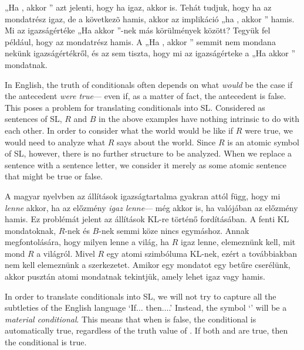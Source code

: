 „Ha , akkor ” azt jelenti, hogy ha  igaz, akkor  is. Tehát tudjuk, hogy ha
az  mondatrész igaz, de a következõ  hamis, akkor az implikáció „ha
 , akkor  ” hamis. Mi az igazságértéke „Ha  akkor ”-nek más körülmények között?
Tegyük fel például, hogy az  mondatrész hamis. A „Ha , akkor ” semmit nem mondana
 nekünk   igazságértékről, és az sem tiszta, hogy mi az igazságérteke a „Ha  akkor ” mondatnak.




In English, the truth of conditionals often depends on what \emph{would} be the case if the antecedent \emph{were true}--- even if, as a matter of fact, the antecedent is false. This poses a problem for translating conditionals into SL.  Considered as sentences of SL, $R$ and $B$ in the above examples have nothing intrinsic to do with each other. In order to consider what the world would be like if $R$ were true, we would need to analyze what $R$ says about the world. Since $R$ is an atomic symbol of SL, however, there is no further structure to be analyzed. When we replace a sentence with a sentence letter, we consider it merely as some atomic sentence that might be true or false.

A magyar nyelvben az állítások igazságtartalma gyakran attól függ, hogy mi \emph{lenne} akkor, ha az előzmény \emph{igaz lenne}--- még akkor is, ha valójában az előzmény hamis. Ez problémát jelent az állítások KL-re történő fordításában. A fenti KL mondatoknak, $R$-nek és $B$-nek semmi köze nincs egymáshoz. Annak megfontolására, hogy milyen lenne a világ, ha $R$ igaz lenne, elemeznünk kell, mit mond $R$ a világról. Mivel $R$ egy atomi szimbóluma KL-nek, ezért a továbbiakban nem kell elemeznünk a szerkezetet. Amikor egy mondatot egy betűre cserélünk, akkor pusztán atomi mondatnak tekintjük, amely lehet igaz vagy hamis.

In order to translate conditionals into SL, we will not try to capture all the subtleties of the English language `If$\ldots$ then$\ldots$.' Instead, the symbol `\eif' will be a \emph{material conditional}. This means that when  is false, the conditional \eif{} is automatically true, regardless of the truth value of . If both  and  are true, then the conditional \eif{} is true.

